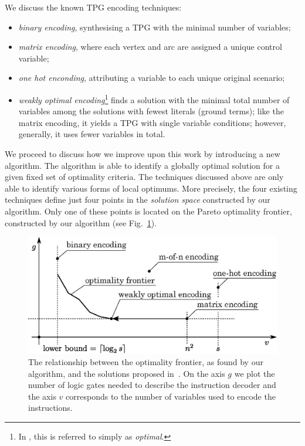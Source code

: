 We discuss the known TPG encoding techniques:
\begin{itemize}
\item \emph{binary encoding}, synthesising a TPG with the minimal number of variables;
\item \emph{matrix encoding}, where each vertex and arc are assigned a unique control variable;
\item \emph{one hot enconding}, attributing a variable to each unique original scenario;
\item \emph{weakly optimal encoding}\footnote{In \cite{2009_mokhov_phd}, this is referred to simply as \emph{optimal}.} finds a solution with the minimal total number of variables among the solutions with fewest literals (ground terms); like the matrix encoding, it yields a TPG with single variable conditions; however, generally, it uses fewer variables in total.    
\end{itemize}

We proceed to discuss how we improve upon this work by introducing a new algorithm. The algorithm is able to identify a globally optimal solution for a given fixed set of optimality criteria. The techniques discussed above are only able to identify various forms of local optimums. More precisely, the four existing techniques define just four points in the \emph{solution space} constructed by our algorithm. Only one of these points is located on the Pareto optimality frontier, constructed by our algorithm (see Fig.~\ref{fig:pareto}).

\begin{figure}[t]
\centering
\includegraphics[scale=0.7]{fig/optimality_frontier}
\caption[The optimality frontier]{\label{fig:pareto}The relationship between the optimality frontier, as found by our algorithm, and the solutions proposed in~\cite{2009_mokhov_phd}. On the axis $g$ we plot the number of logic gates needed to describe the instruction decoder and the axis $v$ corresponds to the number of variables used to encode the instructions.}
\end{figure} 
 
